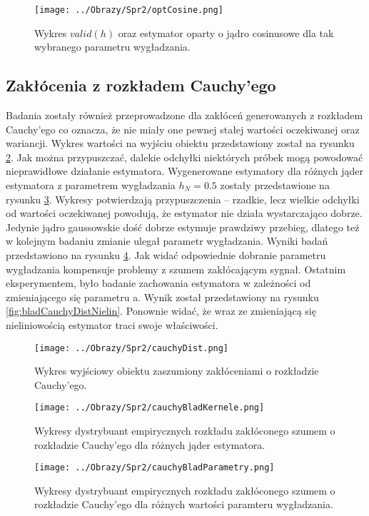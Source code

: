 \documentclass[12pt,a4paper]{article}
\begin{document}
\begin{figure}[H]
\centering
\texttt{[image: ../Obrazy/Spr2/optCosine.png]} 
\caption{Wykres $valid(h)$ oraz estymator oparty o jądro cosinusowe dla tak wybranego parametru wygładzania.}
\label{fig:optCosine}
\end{figure}

\subsection{Zakłócenia z rozkładem Cauchy'ego}
Badania zostały również przeprowadzone dla zakłóceń generowanych z rozkładem Cauchy'ego co oznacza, że nie miały one pewnej stałej wartości oczekiwanej oraz wariancji.
Wykres wartości na wyjściu obiektu przedstawiony został na rysunku \ref{fig:cauchyDist}.
Jak można przypuszczać, dalekie odchyłki niektórych próbek mogą powodować nieprawidłowe działanie estymatora.
Wygenerowane estymatory dla różnych jąder estymatora z parametrem wygładzania $h_{N}=0.5$ zostały przedstawione na rysunku \ref{fig:bladCauchyDist}.
Wykresy potwierdzają przypuszczenia -- rzadkie, lecz wielkie odchyłki od wartości oczekiwanej powodują, że estymator nie działa wystarczająco dobrze.
Jedynie jądro gaussowskie dość dobrze estymuje prawdziwy przebieg, dlatego też w kolejnym badaniu zmianie ulegał parametr wygładzania.
Wyniki badań przedstawiono na rysunku \ref{fig:bladCauchyDistParam}.
Jak widać odpowiednie dobranie parametru wygładzania kompensuje problemy z szumem zakłócającym sygnał.
Ostatnim eksperymentem, było badanie zachowania estymatora w zależności od zmieniającego się parametru a.
Wynik został przedstawiony na rysunku \ref{fig:bladCauchyDistNielin}.
Ponownie widać, że wraz ze zmieniającą się nieliniowością estymator traci swoje właściwości.

\begin{figure}[H]
\centering
\texttt{[image: ../Obrazy/Spr2/cauchyDist.png]} 
\caption{Wykres wyjściowy obiektu zaszumiony zakłóceniami o rozkładzie Cauchy'ego.}
\label{fig:cauchyDist}
\end{figure}

\begin{figure}[H]
\centering
\texttt{[image: ../Obrazy/Spr2/cauchyBladKernele.png]} 
\caption{Wykresy dystrybuant empirycznych rozkładu zakłóconego szumem o rozkładzie Cauchy'ego dla różnych jąder estymatora.}
\label{fig:bladCauchyDist}
\end{figure}

\begin{figure}[H]
\centering
\texttt{[image: ../Obrazy/Spr2/cauchyBladParametry.png]} 
\caption{Wykresy dystrybuant empirycznych rozkładu zakłóconego szumem o rozkładzie Cauchy'ego dla różnych wartości paramteru wygładzania.}
\label{fig:bladCauchyDistParam}
\end{figure}
\end{document}

